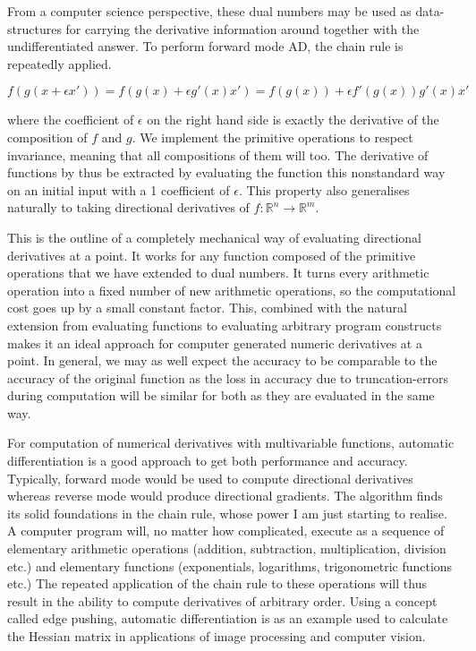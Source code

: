 \documentclass[11pt]{article}
\begin{document}
From a computer science perspective, these dual numbers may be used as data-structures for carrying the derivative information around together with the undifferentiated answer. To perform forward mode AD, the chain rule is repeatedly applied.

\[ f(g(x+ \epsilon x')) = f(g(x) + \epsilon g'(x)x') = f(g(x)) + \epsilon f'(g(x)) g'(x) x' \]

where the coefficient of $ \epsilon $ on the right hand side is exactly the derivative of the composition of $ f $ and $ g $. We implement the primitive operations to respect invariance, meaning that all compositions of them will too. The derivative of functions by thus be extracted by evaluating the function this nonstandard way on an initial input with a 1 coefficient of $ \epsilon $. This property also generalises naturally to taking directional derivatives of $ f: \mathbb{R}^n\rightarrow \mathbb{R}^m $. 

This is the outline of a completely mechanical way of evaluating directional derivatives at a point. It works for any function composed of the primitive operations that we have extended to dual numbers. It turns every arithmetic operation into a fixed number of new arithmetic operations, so the computational cost goes up by a small constant factor. This, combined with the natural extension from evaluating functions to evaluating arbitrary program constructs makes it an ideal approach for computer generated numeric derivatives at a point. In general, we may as well expect the accuracy to be comparable to the accuracy of the original function as the loss in accuracy due to truncation-errors during computation will be similar for both as they are evaluated in the same way. 

For computation of numerical derivatives with multivariable functions, automatic differentiation is a good approach to get both performance and accuracy. Typically, forward mode would be used to compute directional derivatives whereas reverse mode would produce directional gradients. The algorithm finds its solid foundations in the chain rule, whose power I am just starting to realise. A computer program will, no matter how complicated, execute as a sequence of elementary arithmetic operations (addition, subtraction, multiplication, division etc.) and elementary functions (exponentials, logarithms, trigonometric functions etc.) The repeated application of the chain rule to these operations will thus result in the ability to compute derivatives of arbitrary order. Using a concept called edge pushing, automatic differentiation is as an example used to calculate the Hessian matrix in applications of image processing and computer vision.  
\end{document}
